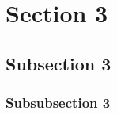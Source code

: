 
\SetLeftHeader{}
\SetRightHeader{}
\SetLeftFooter{}

\section{Section 3}

  \subsection{Subsection 3}

    \lipsum[1]

    \subsubsection{Subsubsection 3}

      \lipsum[1-7]
